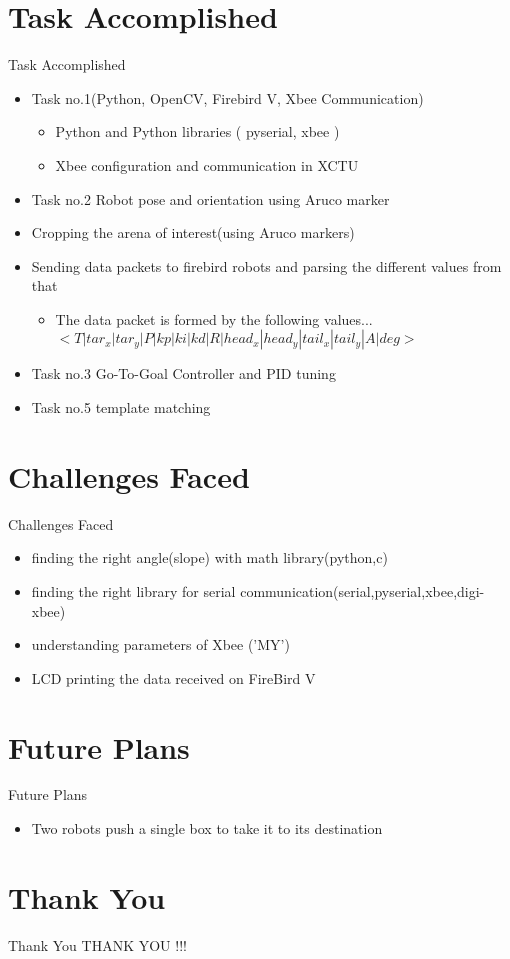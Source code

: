 \documentclass[10pt, a4paper]{beamer}
\begin{document}
\section{Task Accomplished}
\begin{frame}{Task Accomplished}
	\begin{itemize}
		\item Task no.1(Python, OpenCV, Firebird V, Xbee Communication)
		\begin{itemize}
		\item Python and Python libraries ( pyserial, xbee )
		\item Xbee configuration and communication in XCTU
		\end{itemize}
		\item Task no.2  Robot pose and orientation using Aruco marker
		\item Cropping the arena of interest(using Aruco markers)
		\item Sending data packets to firebird robots and parsing the different values from that
		\begin{itemize}
		\item The data packet is formed by the following values...
		$<T|tar_x|tar_y|P|kp|ki|kd|R|head_x|head_y|tail_x|tail_y|A|deg>$ 
		\end{itemize} 
		\item Task no.3 Go-To-Goal Controller and PID tuning
		\item Task no.5 template matching
		
	\end{itemize}
\end{frame}

\section{Challenges Faced}
\begin{frame}{Challenges Faced}
	\begin{itemize}
	    \item finding the right angle(slope) with math library(python,c)
		\item finding the right library for serial communication(serial,pyserial,xbee,digi-xbee)
		\item understanding parameters of Xbee ('MY')
		\item LCD printing the data received on FireBird V 
	\end{itemize}
\end{frame}

\section{Future Plans}
\begin{frame}{Future Plans}
	\begin{itemize}
		\item Two robots push a single box to take it to its destination
	\end{itemize}
\end{frame}


\section{Thank You}
\begin{frame}{Thank You}
	\centering THANK YOU !!!
\end{frame}
\end{document}
